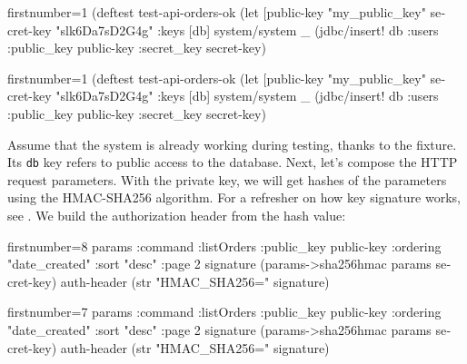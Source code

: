 \ifx\DEVICETYPE\MOBILE

\begin{english}
  \begin{clojure/lines*}{firstnumber=1}
(deftest test-api-orders-ok
  (let [public-key "my_public_key"
        secret-key "slk6Da7sD2G4g"
        {:keys [db]} system/system
        _ (jdbc/insert! db :users
            {:public_key public-key
             :secret_key secret-key})
  \end{clojure/lines*}
\end{english}

\else

\begin{english}
  \begin{clojure/lines*}{firstnumber=1}
(deftest test-api-orders-ok
  (let [public-key "my_public_key"
        secret-key "slk6Da7sD2G4g"
        {:keys [db]} system/system
        _ (jdbc/insert! db :users {:public_key public-key
                                   :secret_key secret-key})
  \end{clojure/lines*}
\end{english}

\fi

\wavebottom

Assume that the system is already working during testing, thanks to the fixture. Its \verb|db| key refers to public access to the database. Next, let's compose the HTTP request parameters. With the private key, we will get hashes of the parameters using the HMAC-SHA256 algorithm. For a refresher on how key signature works, see . We build the authorization header from the hash value:

\wavetop

\ifx\DEVICETYPE\MOBILE

\begin{english}
  \begin{clojure/lines*}{firstnumber=8}
    params {:command :listOrders
            :public_key public-key
            :ordering "date_created"
            :sort "desc"
            :page 2}
    signature (params->sha256hmac
                params secret-key)
    auth-header (str "HMAC_SHA256="
                  signature)
  \end{clojure/lines*}
\end{english}

\else

\begin{english}
  \begin{clojure/lines*}{firstnumber=7}
        params {:command :listOrders
                :public_key public-key
                :ordering "date_created"
                :sort "desc"
                :page 2}
        signature (params->sha256hmac params secret-key)
        auth-header (str "HMAC_SHA256=" signature)
  \end{clojure/lines*}
\end{english}

